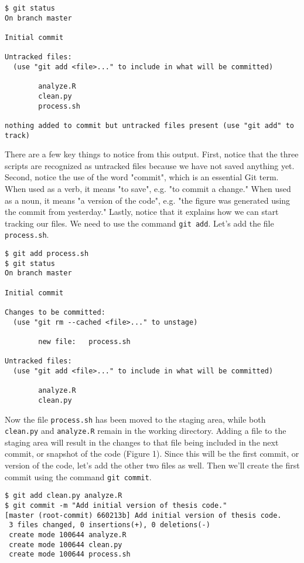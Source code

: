\begin{lstlisting}
$ git status
On branch master

Initial commit

Untracked files:
  (use "git add <file>..." to include in what will be committed)

        analyze.R
        clean.py
        process.sh

nothing added to commit but untracked files present (use "git add" to track)
\end{lstlisting}

There are a few key things to notice from this output.
First, notice that the three scripts are recognized as untracked files because we have not saved anything yet.
Second, notice the use of the word "commit", which is an essential Git term.
When used as a verb, it means "to save", e.g. "to commit a change."
When used as a noun, it means "a version of the code", e.g. "the figure was generated using the commit from yesterday."
Lastly, notice that it explains how we can start tracking our files.
We need to use the command \verb|git add|.
Let's add the file \verb|process.sh|.

\begin{lstlisting}
$ git add process.sh
$ git status
On branch master

Initial commit

Changes to be committed:
  (use "git rm --cached <file>..." to unstage)

        new file:   process.sh

Untracked files:
  (use "git add <file>..." to include in what will be committed)

        analyze.R
        clean.py
\end{lstlisting}

Now the file \verb|process.sh| has been moved to the staging area, while both \verb|clean.py| and \verb|analyze.R| remain in the working directory.
Adding a file to the staging area will result in the changes to that file being included in the next commit, or snapshot of the code (Figure 1).
Since this will be the first commit, or version of the code, let's add the other two files as well.
Then we'll create the first commit using the command \verb|git commit|.

\begin{lstlisting}
$ git add clean.py analyze.R
$ git commit -m "Add initial version of thesis code."
[master (root-commit) 660213b] Add initial version of thesis code.
 3 files changed, 0 insertions(+), 0 deletions(-)
 create mode 100644 analyze.R
 create mode 100644 clean.py
 create mode 100644 process.sh
\end{lstlisting}

